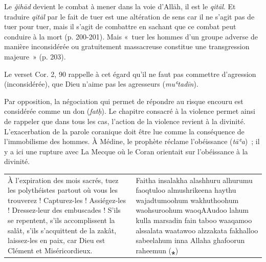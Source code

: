 
Le \emph{ǧihād} devient le combat à mener dans la voie d'Allāh, il est
le \emph{qitāl}. Et traduire \emph{qitāl} par le fait de tuer est une
altération de sens car il ne s'agit pas de tuer pour tuer, mais il
s'agit de combattre en sachant que ce combat peut conduire à la mort (p.
200-201). Mais «~tuer les hommes d'un groupe adverse de manière
inconsidérée ou gratuitement massacreuse constitue une transgression
majeure~» (p. 203).





Le verset Cor. 2, 90 rappelle à cet égard qu'il ne faut pas commettre
d'agression (inconsidérée), que Dieu n'aime pas les agresseurs
(\emph{muʿtadīn}).

Par opposition, la négociation qui permet de répondre au risque encouru
est considérée comme un don (\emph{fatḥ}). Le chapitre consacré à la
violence permet ainsi de rappeler que dans tous les cas, l'action de la
violence revient à la divinité. L'exacerbation de la parole coranique
doit être lue comme la conséquence de l'immobilisme des hommes. À
Médine, le prophète réclame l'obéissance (\emph{tāʿa})~; il y a ici une
rupture avec La Mecque où le Coran orientait sur l'obéissance à la
divinité.

\begin{table}[h!]
    \centering
    \small
   \begin{tabular}{p{}p{} }
À l'expiration des mois sacrés, tuez les polythéistes partout où vous
les trouverez ! Capturez-les ! Assiégez-les ! Dressez-leur des
embuscades ! S'ils se repentent, s'ils accomplissent la salât, s'ils
s'acquittent de la zakât, laissez-les en paix, car Dieu est Clément et
Miséricordieux. & Faitha insalakha alashhuru alhurumu faoqtuloo
almushrikeena haythu wajadtumoohum wakhuthoohum waohsuroohum waoqAAudoo
lahum kulla marsadin fain taboo waaqamoo alssalata waatawoo alzzakata
fakhalloo sabeelahum inna Allaha ghafoorun raheemun (⁎) \\
 
\end{tabular}
\end{table}

